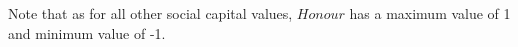 Note that as for all other social capital values, $Honour$ has a maximum value of 1 and minimum value of -1.




